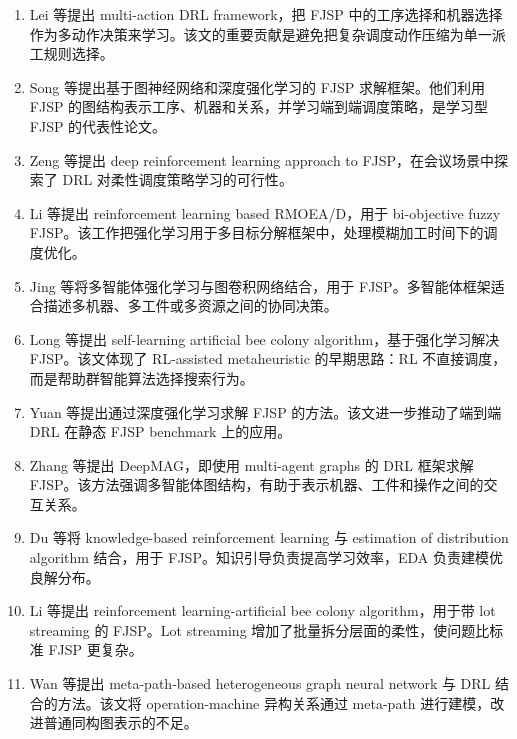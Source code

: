 \documentclass[UTF8,a4paper,11pt]{ctexart}
\begin{document}
\begin{enumerate}[label=\textbf{L\arabic*.},leftmargin=3em]
\item Lei 等提出 multi-action DRL framework，把 FJSP 中的工序选择和机器选择作为多动作决策来学习\cite{Lei2022MultiAction}。该文的重要贡献是避免把复杂调度动作压缩为单一派工规则选择。

\item Song 等提出基于图神经网络和深度强化学习的 FJSP 求解框架\cite{Song2022GNNDRL}。他们利用 FJSP 的图结构表示工序、机器和关系，并学习端到端调度策略，是学习型 FJSP 的代表性论文。

\item Zeng 等提出 deep reinforcement learning approach to FJSP，在会议场景中探索了 DRL 对柔性调度策略学习的可行性\cite{Zeng2022DRL}。

\item Li 等提出 reinforcement learning based RMOEA/D，用于 bi-objective fuzzy FJSP\cite{Li2022FuzzyRL}。该工作把强化学习用于多目标分解框架中，处理模糊加工时间下的调度优化。

\item Jing 等将多智能体强化学习与图卷积网络结合，用于 FJSP\cite{Jing2022MARL}。多智能体框架适合描述多机器、多工件或多资源之间的协同决策。

\item Long 等提出 self-learning artificial bee colony algorithm，基于强化学习解决 FJSP\cite{Long2022ABC}。该文体现了 RL-assisted metaheuristic 的早期思路：RL 不直接调度，而是帮助群智能算法选择搜索行为。

\item Yuan 等提出通过深度强化学习求解 FJSP 的方法\cite{Yuan2024DRL}。该文进一步推动了端到端 DRL 在静态 FJSP benchmark 上的应用。

\item Zhang 等提出 DeepMAG，即使用 multi-agent graphs 的 DRL 框架求解 FJSP\cite{Zhang2023DeepMAG}。该方法强调多智能体图结构，有助于表示机器、工件和操作之间的交互关系。

\item Du 等将 knowledge-based reinforcement learning 与 estimation of distribution algorithm 结合，用于 FJSP\cite{Du2023KBEDA}。知识引导负责提高学习效率，EDA 负责建模优良解分布。

\item Li 等提出 reinforcement learning-artificial bee colony algorithm，用于带 lot streaming 的 FJSP\cite{Li2023RLABC}。Lot streaming 增加了批量拆分层面的柔性，使问题比标准 FJSP 更复杂。

\item Wan 等提出 meta-path-based heterogeneous graph neural network 与 DRL 结合的方法\cite{Wan2024MHGNN}。该文将 operation-machine 异构关系通过 meta-path 进行建模，改进普通同构图表示的不足。


\end{enumerate}
\end{document}
